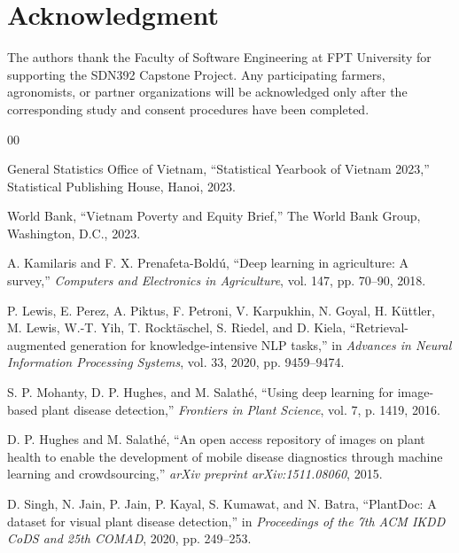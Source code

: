 \documentclass[conference]{IEEEtran}
\begin{document}
\section*{Acknowledgment}

The authors thank the Faculty of Software Engineering at FPT University for supporting the SDN392 Capstone Project. Any participating farmers, agronomists, or partner organizations will be acknowledged only after the corresponding study and consent procedures have been completed.

\begin{thebibliography}{00}

General Statistics Office of Vietnam, ``Statistical Yearbook of Vietnam 2023,'' Statistical Publishing House, Hanoi, 2023.

World Bank, ``Vietnam Poverty and Equity Brief,'' The World Bank Group, Washington, D.C., 2023.

A. Kamilaris and F. X. Prenafeta-Bold\'{u}, ``Deep learning in agriculture: A survey,'' \textit{Computers and Electronics in Agriculture}, vol. 147, pp. 70--90, 2018.

P. Lewis, E. Perez, A. Piktus, F. Petroni, V. Karpukhin, N. Goyal, H. K\"{u}ttler, M. Lewis, W.-T. Yih, T. Rockt\"{a}schel, S. Riedel, and D. Kiela, ``Retrieval-augmented generation for knowledge-intensive NLP tasks,'' in \textit{Advances in Neural Information Processing Systems}, vol. 33, 2020, pp. 9459--9474.

S. P. Mohanty, D. P. Hughes, and M. Salath\'{e}, ``Using deep learning for image-based plant disease detection,'' \textit{Frontiers in Plant Science}, vol. 7, p. 1419, 2016.

D. P. Hughes and M. Salath\'{e}, ``An open access repository of images on plant health to enable the development of mobile disease diagnostics through machine learning and crowdsourcing,'' \textit{arXiv preprint arXiv:1511.08060}, 2015.

D. Singh, N. Jain, P. Jain, P. Kayal, S. Kumawat, and N. Batra, ``PlantDoc: A dataset for visual plant disease detection,'' in \textit{Proceedings of the 7th ACM IKDD CoDS and 25th COMAD}, 2020, pp. 249--253.


\end{thebibliography}
\end{document}

